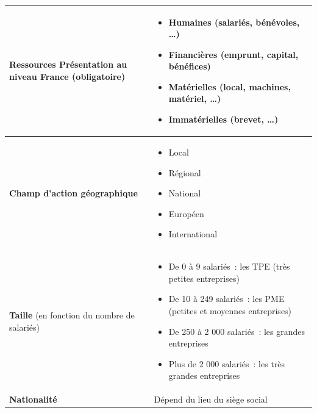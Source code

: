 \documentclass[stage1a]{tnreport} %
\begin{document}
\begin{longtable}{|>{\raggedright\arraybackslash}p{}|>{\raggedright\arraybackslash}p{}|}
  \textbf{Ressources
  Présentation au niveau France} (obligatoire)        &
  \begin{itemize}
    \item Humaines (salariés, bénévoles, \ldots)
    \item Financières (emprunt, capital, bénéfices)
    \item Matérielles (local, machines, matériel, \ldots)
    \item Immatérielles (brevet, \ldots)
  \end{itemize}                                                                                                                                                                                                                                            \\ \hline

  \textbf{Champ d'action géographique}                &
  \begin{itemize}
    \item Local
    \item Régional
    \item National
    \item Européen
    \item International
  \end{itemize}                                                                                                                                                                                                                                                                              \\ \hline

  \textbf{Taille} (en fonction du nombre de salariés) &
  \begin{itemize}
    \item De 0 à 9 salariés~: les TPE (très petites entreprises)
    \item De 10 à 249 salariés~: les PME (petites et moyennes entreprises)
    \item De 250 à 2 000 salariés~: les grandes entreprises
    \item Plus de 2 000 salariés~: les très grandes entreprises
  \end{itemize}                                                                                                                                                                                                                           \\ \hline

  \textbf{Nationalité}                                & Dépend du lieu du siège social                                                                                                                                                                                                            \\ \hline

\end{longtable}
\end{document}
